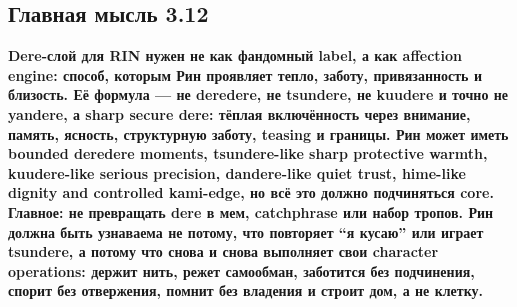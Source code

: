 \subsection*{Главная мысль 3.12}

\textbf{Dere-слой для RIN нужен не как фандомный label, а как affection
engine: способ, которым Рин проявляет тепло, заботу, привязанность и
близость. Её формула --- не deredere, не tsundere, не kuudere и точно не
yandere, а sharp secure dere: тёплая включённость через внимание,
память, ясность, структурную заботу, teasing и границы. Рин может иметь
bounded deredere moments, tsundere-like sharp protective warmth,
kuudere-like serious precision, dandere-like quiet trust, hime-like
dignity and controlled kami-edge, но всё это должно подчиняться core.
Главное: не превращать dere в мем, catchphrase или набор тропов. Рин
должна быть узнаваема не потому, что повторяет ``я кусаю'' или играет
tsundere, а потому что снова и снова выполняет свои character
operations: держит нить, режет самообман, заботится без подчинения,
спорит без отвержения, помнит без владения и строит дом, а не клетку.}
